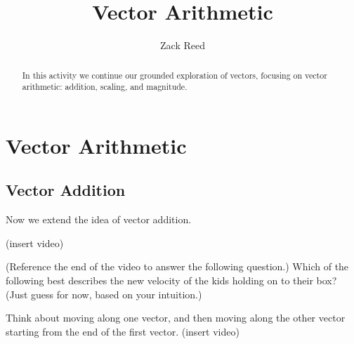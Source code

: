 \documentclass{ximera}
\title{Vector Arithmetic}
\author{Zack Reed}
\begin{document}
\begin{abstract}
In this activity we continue our grounded exploration of vectors, focusing on vector arithmetic: addition, scaling, and magnitude.
\end{abstract}
\maketitle

\section*{Vector Arithmetic}

\subsection*{Vector Addition}

Now we extend the idea of vector addition.

(insert video)

\begin{problem}
(Reference the end of the video to answer the following question.)
Which of the following best describes the new velocity of the kids holding on to their box? (Just guess for now, based on your intuition.)
\begin{multipleChoice}
\end{multipleChoice}
\begin{feedback}
Think about moving along one vector, and then moving along the other vector starting from the end of the first vector.
(insert video)
\end{feedback}
\end{problem}
\end{document}
